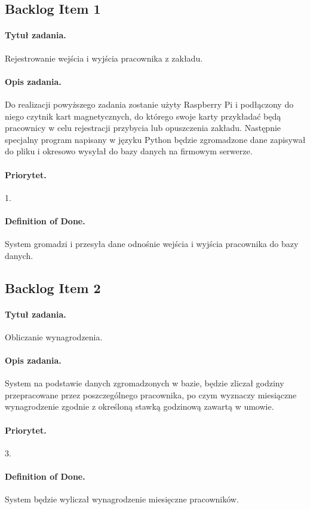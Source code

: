 \documentclass[a4paper]{article}
\begin{document}
\subsection{Backlog Item 1}
\paragraph{Tytuł zadania.} Rejestrowanie wejścia i wyjścia pracownika z zakładu.
\paragraph{Opis zadania.} Do realizacji powyższego zadania zostanie użyty Raspberry Pi i podłączony do niego czytnik kart magnetycznych, do którego swoje karty przykładać będą pracownicy w celu rejestracji przybycia lub opuszczenia zakładu. Następnie specjalny program napisany w języku Python będzie zgromadzone dane zapisywał do pliku i okresowo wysyłał do bazy danych na firmowym serwerze.
\paragraph{Priorytet.} 1.
\paragraph{Definition of Done.} System gromadzi i przesyła dane odnośnie wejścia i wyjścia pracownika do bazy danych.

\subsection{Backlog Item 2}
\paragraph{Tytuł zadania.} Obliczanie wynagrodzenia.
\paragraph{Opis zadania.} System na podstawie danych zgromadzonych w bazie, będzie zliczał godziny przepracowane przez poszczególnego pracownika, po czym wyznaczy miesiączne wynagrodzenie zgodnie z określoną stawką godzinową zawartą w umowie.
\paragraph{Priorytet.} 3.
\paragraph{Definition of Done.} System będzie wyliczał wynagrodzenie miesięczne pracowników.
\end{document}
